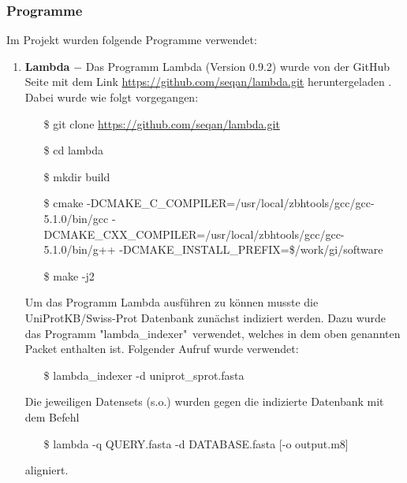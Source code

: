 \documentclass[10pt, a4paper]{article}[08.12.2015]
\begin{document}
      \subsubsection{Programme}
        Im Projekt wurden folgende Programme verwendet:
        
        \begin{enumerate}
          
          \item \textbf{Lambda} $-$ Das Programm Lambda (Version 0.9.2) wurde 			  von der GitHub Seite mit dem Link 											  \url{https://github.com/seqan/lambda.git} heruntergeladen 					  \cite{hauswedell2014}. Dabei wurde wie folgt vorgegangen:
          \begin{itemize}
            \item[\$] git clone \url{https://github.com/seqan/lambda.git}
            \item[\$] cd lambda
            \item[\$] mkdir build
            \item[\$] cmake 																    -DCMAKE\_C\_COMPILER=/usr/local/zbhtools/gcc/gcc-5.1.0/bin/gcc 
            -DCMAKE\_CXX\_COMPILER=/usr/local/zbhtools/gcc/gcc-5.1.0/bin/g++ 
            -DCMAKE\_INSTALL\_PREFIX=\$/work/gi/software 
            \item[\$] make -j2													   
          \end{itemize}
          Um das Programm Lambda ausf\"uhren zu k\"onnen musste die 					  UniProtKB/Swiss-Prot Datenbank zun\"achst indiziert werden. Dazu 				  wurde das Programm "lambda\_indexer"\ verwendet, welches in dem oben 		  genannten Packet enthalten ist. Folgender Aufruf wurde verwendet:
          \begin{itemize}
            \item[\$] lambda\_indexer -d uniprot\_sprot.fasta
          \end{itemize}
          Die jeweiligen Datensets (s.o.) wurden gegen die indizierte 					  Datenbank mit dem Befehl
          \begin{itemize}
            \item[\$] lambda -q QUERY.fasta -d DATABASE.fasta [-o output.m8]
          \end{itemize}
          aligniert.
          

\end{enumerate}
\end{document}
